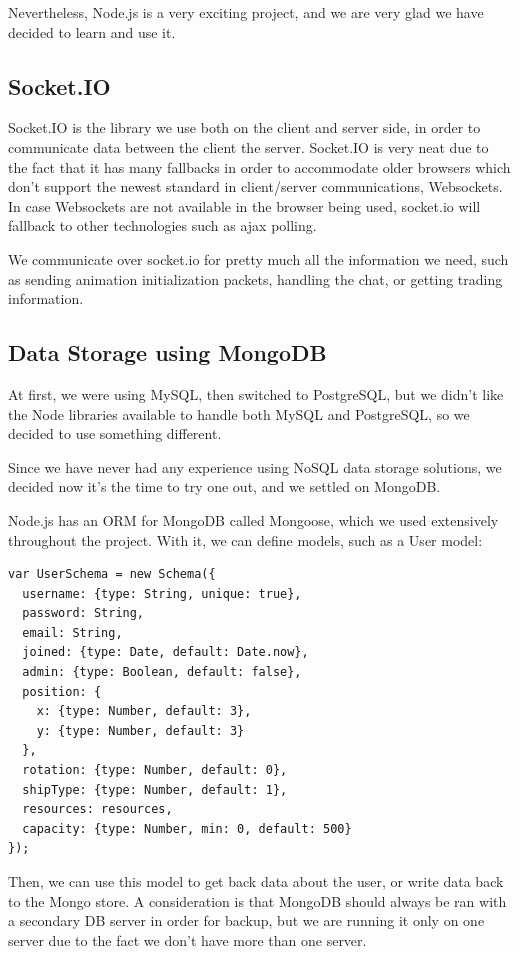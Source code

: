 \documentclass[a4paper,11pt]{article}
\begin{document}
			Nevertheless, Node.js is a very exciting project, and we are very glad we have decided to learn and use it.		
		
		\subsection{Socket.IO}
		
			Socket.IO is the library we use both on the client and server side, in order to communicate data between the client the server. Socket.IO is very neat due to the fact that it has many fallbacks in order to accommodate older browsers which don't support the newest standard in client/server communications, Websockets. In case Websockets are not available in the browser being used, socket.io will fallback to other technologies such as ajax polling.
		
			We communicate over socket.io for pretty much all the information we need, such as sending animation initialization packets, handling the chat, or getting trading information.
		
		\subsection{Data Storage using MongoDB}
			At first, we were using MySQL, then switched to PostgreSQL, but we didn't like the Node libraries available to handle both MySQL and PostgreSQL, so we decided to use something different.
			 
			Since we have never had any experience using NoSQL data storage solutions, we decided now it's the time to try one out, and we settled on MongoDB.
			
			Node.js has an ORM for MongoDB called Mongoose, which we used extensively throughout the project. With it, we can define models, such as a User model:
			
			\begin{verbatim}
var UserSchema = new Schema({
  username: {type: String, unique: true},
  password: String,
  email: String,
  joined: {type: Date, default: Date.now},
  admin: {type: Boolean, default: false},
  position: {
    x: {type: Number, default: 3},
    y: {type: Number, default: 3}
  },
  rotation: {type: Number, default: 0},
  shipType: {type: Number, default: 1},
  resources: resources,
  capacity: {type: Number, min: 0, default: 500}
});
			\end{verbatim}
		
			Then, we can use this model to get back data about the user, or write data back to the Mongo store.
			A consideration is that MongoDB should always be ran with a secondary DB server in order for backup, but we are running it only on one server due to the fact we don't have more than one server.
			
\end{document}
